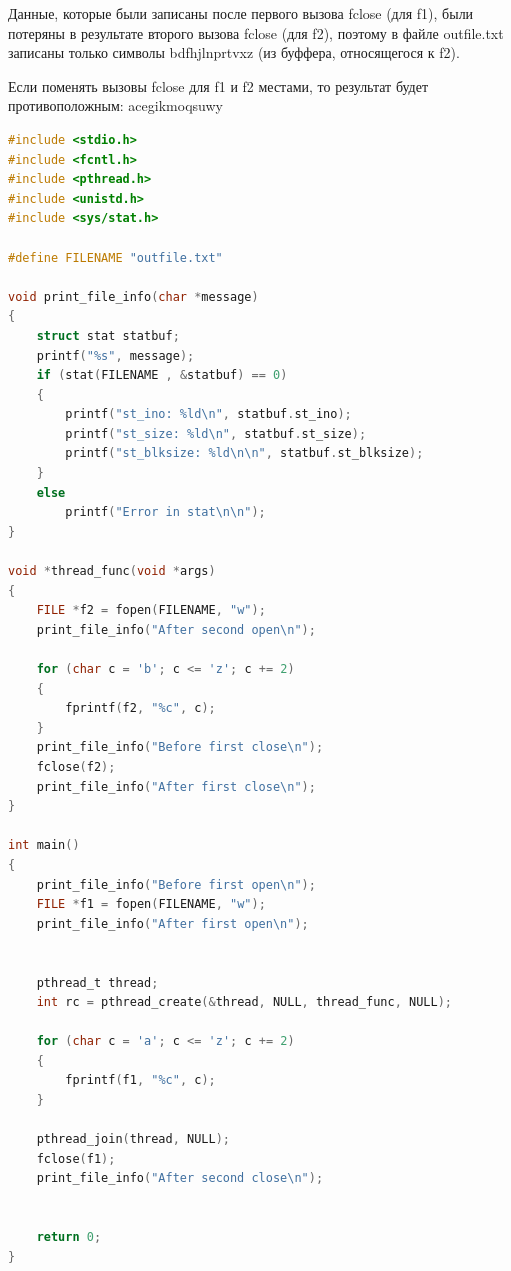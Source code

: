 \documentclass[12pt]{report}
\begin{document}
Данные, которые были записаны после первого вызова fclose (для f1), были потеряны в результате второго вызова fclose (для f2), поэтому в файле outfile.txt записаны только символы bdfhjlnprtvxz (из буффера, относящегося к f2).

Если поменять вызовы fclose для f1 и f2 местами, то результат будет противоположным: acegikmoqsuwy







\begin{lstlisting}[language=c, label=p3thread, caption=Третья программа (реализация с потоками)]
#include <stdio.h>
#include <fcntl.h>
#include <pthread.h>
#include <unistd.h>
#include <sys/stat.h>

#define FILENAME "outfile.txt"

void print_file_info(char *message)
{
    struct stat statbuf;
    printf("%s", message);
    if (stat(FILENAME , &statbuf) == 0)
    {
        printf("st_ino: %ld\n", statbuf.st_ino);
        printf("st_size: %ld\n", statbuf.st_size);
        printf("st_blksize: %ld\n\n", statbuf.st_blksize);
    }
    else
        printf("Error in stat\n\n");
}

void *thread_func(void *args)
{
    FILE *f2 = fopen(FILENAME, "w");
    print_file_info("After second open\n");

    for (char c = 'b'; c <= 'z'; c += 2)
    {
        fprintf(f2, "%c", c);
    }
    print_file_info("Before first close\n");
    fclose(f2);
    print_file_info("After first close\n");
}

int main()
{
    print_file_info("Before first open\n");
    FILE *f1 = fopen(FILENAME, "w");
    print_file_info("After first open\n");
    

    pthread_t thread;
    int rc = pthread_create(&thread, NULL, thread_func, NULL);

    for (char c = 'a'; c <= 'z'; c += 2)
    {
        fprintf(f1, "%c", c);
    }

    pthread_join(thread, NULL);
    fclose(f1);
    print_file_info("After second close\n");


    return 0;
}
\end{lstlisting}
\end{document}
